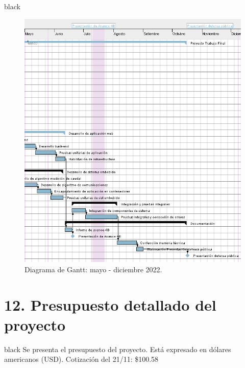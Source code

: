 \documentclass[
11pt, %
codirector, %
]{charter}
\begin{document}
\begin{consigna}{black}
\begin{figure}[htpb]
\centering 
\includegraphics[height=.7\textheight]{./Figuras/TF-gantt2.png}
\caption{Diagrama de Gantt: mayo - diciembre 2022.}
\label{fig:diagGantt2}
\end{figure}


\end{consigna}


\section{12. Presupuesto detallado del proyecto}
\label{sec:presupuesto}

\begin{consigna}{black}
Se presenta el presupuesto del proyecto. Está expresado en dólares americanos (USD). Cotización del 21/11: \$100.58

\end{consigna}
\end{document}
